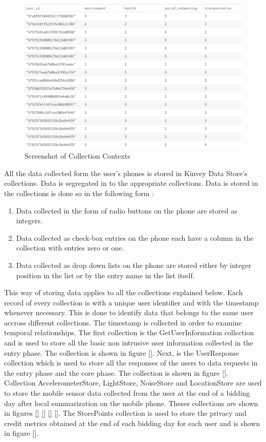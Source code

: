 \begin{figure}[ht!]
\centering
\includegraphics[width=\textwidth,keepaspectratio,height=0.6\textwidth]{./images/collection_context_cat}
\caption{Screenshot of Collection Contexts}
\label{fig:col_c}
\end{figure}

All the data collected form the user's phones is stored in Kinvey Data Store's collections. Data is segregated in to the appropriate collections. Data is stored in the collections is done so in the following form :

\begin{enumerate}
    \item Data collected in the form of radio buttons on the phone are stored as integers.
    \item Data collected as check-box entries on the phone each have a column in the collection with entries zero or one.
    \item Data collected as drop down lists on the phone are stored either by integer position in the list or by the entry name in the list itself.
\end{enumerate}

This way of storing data applies to all the collections explained below. Each record of every collection is with a unique user identifier and with the timestamp whenever necessary. This is done to identify data that belongs to the same user accross different collections. The timestamp
is collected in order to examine temporal relationships.
The first collection is the GetUserInformation collection and is used to store all the basic non intrusive user information 
collected in the entry phase. The collection is shown in figure \ref{}. Next, is the UserResponse collection which is used to store all
the responses of the users to data requests in the entry phase and the core phase. The collection is shown in figure \ref{}. Collection AccelerometerStore, LightStore, NoiseStore and LocationStore are used to store the mobile sensor data collected from the user at the end of a bidding day after local summarization on the mobile phone. Theses collections are shown in figures \ref{} \ref{} \ref{} \ref{}. The StorePoints collection is used to store the privacy and credit metrics obtained at the end of each bidding day  for each user and is shown in figure \ref{}.

